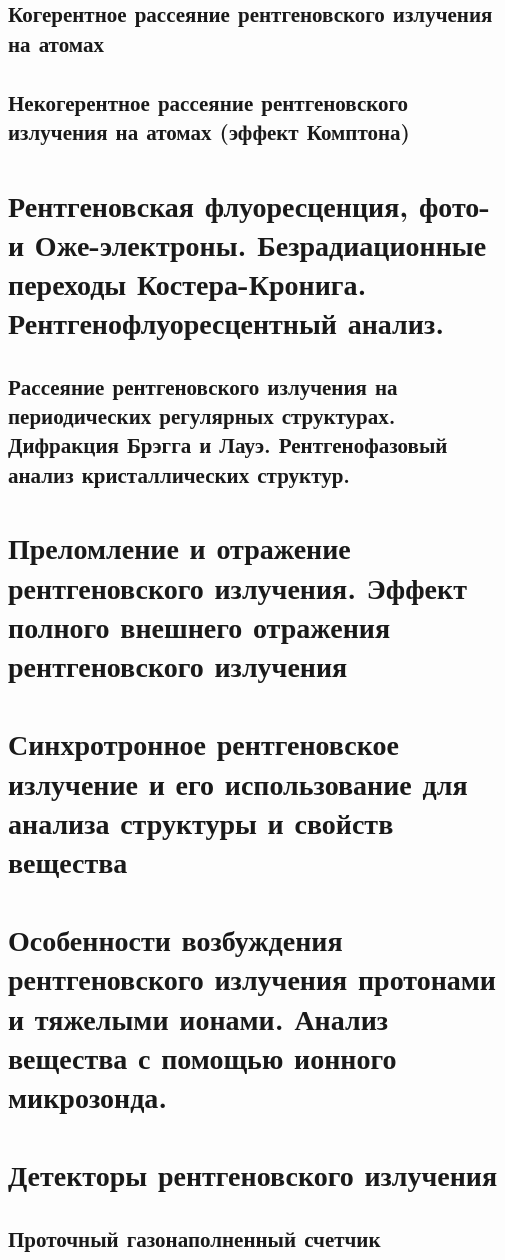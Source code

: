 \documentclass[a4paper,14pt, openany, twoside, draft]{extbook} %
\begin{document}
\section{Когерентное рассеяние рентгеновского излучения на атомах}
\section{Некогерентное рассеяние рентгеновского излучения на атомах (эффект Комптона)}

\chapter{Рентгеновская флуоресценция, фото- и Оже-электроны. Безрадиационные переходы Костера-Кронига. Рентгенофлуоресцентный анализ.}
\label{cha:xray-analisys}

\section{Рассеяние рентгеновского излучения на периодических регулярных структурах. Дифракция Брэгга и Лауэ. Рентгенофазовый анализ кристаллических структур.}
\label{sec:bragg-diffraction}

\chapter{Преломление и отражение рентгеновского излучения. Эффект полного внешнего отражения рентгеновского излучения}
\label{cha:total-reflection}

\chapter{Синхротронное рентгеновское излучение и его использование для анализа структуры и свойств вещества}
\label{cha:syncrotron}

\chapter{Особенности возбуждения рентгеновского излучения протонами и тяжелыми ионами. Анализ вещества с помощью ионного микрозонда.}
\label{cha:ion-micro}

\chapter{Детекторы рентгеновского излучения}
\label{cha:detectors}

\section{Проточный газонаполненный счетчик}
\end{document}
